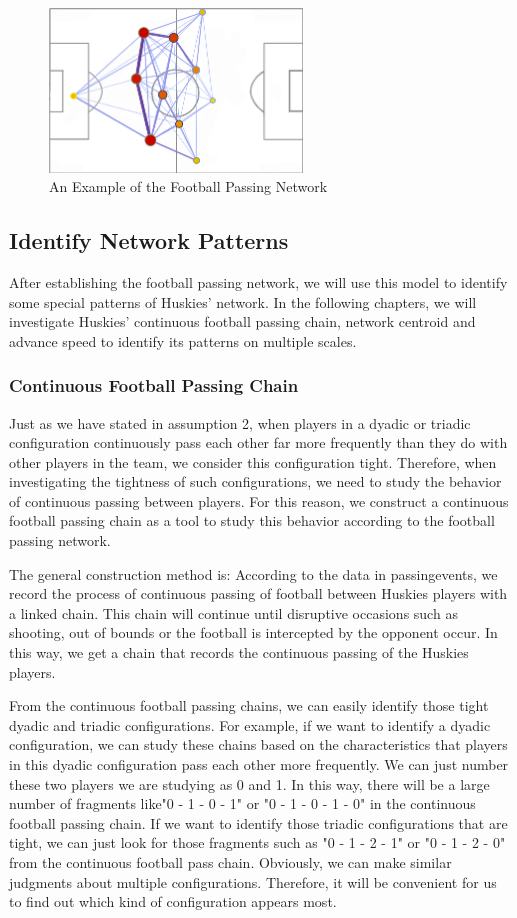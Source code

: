 \documentclass{mcmthesis}
\begin{document}
	\begin{figure}[h]
		\centering
		\includegraphics[width=0.6\textwidth]{figures/playground.png}
		\caption{An Example of the Football Passing Network}
		\label{fig:playground}
	\end{figure}
\subsection{Identify Network Patterns}
	After establishing the football passing network, we will use this model to identify some special patterns of Huskies' network.  In the following chapters, we will investigate Huskies' continuous football passing chain, network centroid and advance speed to identify its patterns on multiple scales. 
\subsubsection{Continuous Football Passing Chain}
	Just as we have stated in assumption 2, when players in a dyadic or triadic configuration continuously pass each other far more frequently than they do with other players in the team, we consider this configuration tight.  Therefore, when investigating the tightness of such configurations, we need to study the behavior of continuous passing between players.  For this reason, we construct a continuous football passing chain as a tool to study this behavior according to the football passing network.

	The general construction method is: According to the data in passingevents, we record the process of continuous passing of football between Huskies players with a linked chain.  This chain will continue until disruptive occasions such as shooting, out of bounds or the football is intercepted by the opponent occur.  In this way, we get a chain that records the continuous passing of the Huskies players.

	From the continuous football passing chains, we can easily identify those tight dyadic and triadic configurations.  For example, if we want to identify a dyadic configuration, we can study these chains based on the characteristics that players in this dyadic configuration pass each other more frequently.  We can just number these two players we are studying as 0 and 1. In this way, there will be a large number of fragments like"0 - 1 - 0 - 1" or "0 - 1 - 0 - 1 - 0" in the continuous football passing chain.  If we want to identify those triadic configurations that are tight, we can just look for those fragments such as "0 - 1 - 2 - 1" or "0 - 1 - 2 - 0" from the continuous football pass chain.  Obviously, we can make similar judgments about multiple configurations.  Therefore, it will be convenient for us to find out which kind of configuration appears most.
\end{document}
